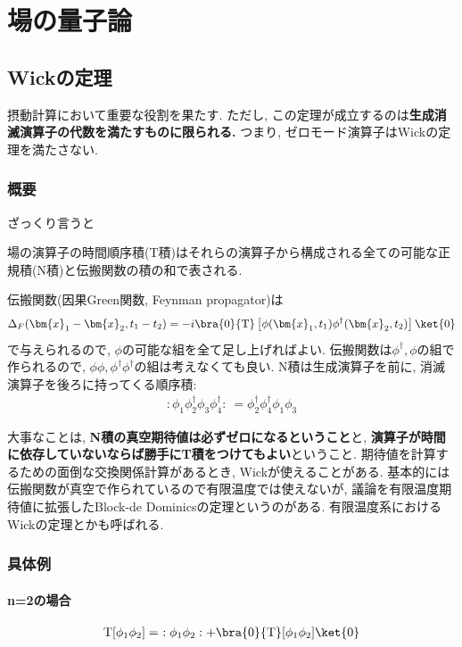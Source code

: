 \documentclass[10.5pt,a4paper]{jreport}
\begin{document}
\newpage
\chapter{場の量子論}
\section{Wickの定理}
摂動計算において重要な役割を果たす. ただし, この定理が成立するのは\textbf{生成消滅演算子の代数を満たすものに限られる. }つまり, ゼロモード演算子はWickの定理を満たさない. 
\subsection{概要}
ざっくり言うと
\begin{screen}
  場の演算子の時間順序積(T積)はそれらの演算子から構成される全ての可能な正規積(N積)と伝搬関数の積の和で表される.
\end{screen}
伝搬関数(因果Green関数, Feynman propagator)は
\begin{eqnarray}
  \Delta_F(\bm{x}_1-\bm{x}_2, t_1-t_2) = -i\bra{0}{\rm T}\left[\phi(\bm{x}_1, t_1)\phi^\dagger(\bm{x}_2, t_2)\right]\ket{0}
\end{eqnarray}
で与えられるので, $\phi$の可能な組を全て足し上げればよい. 伝搬関数は$\phi^\dagger, \phi$の組で作られるので, $\phi\phi, \phi^\dagger\phi^\dagger$の組は考えなくても良い. 
N積は生成演算子を前に, 消滅演算子を後ろに持ってくる順序積:
\begin{eqnarray}
  :\phi_1\phi^\dagger_2\phi_3\phi^\dagger_4:\ = \phi^\dagger_2\phi^\dagger_4\phi_1\phi_3
\end{eqnarray}

大事なことは, \textbf{N積の真空期待値は必ずゼロになるということ}と, \textbf{演算子が時間に依存していないならば勝手にT積をつけてもよい}ということ. 期待値を計算するための面倒な交換関係計算があるとき, Wickが使えることがある. 基本的には伝搬関数が真空で作られているので有限温度では使えないが, 議論を有限温度期待値に拡張したBlock-de Dominicsの定理というのがある. 有限温度系におけるWickの定理とかも呼ばれる. 
\subsection{具体例}
\subsubsection{n=2の場合}
\begin{eqnarray}
  {\rm T}[\phi_1\phi_2] =\ :\phi_1\phi_2: + \bra{0}{\rm T}[\phi_1\phi_2]\ket{0}
\end{eqnarray}
\end{document}
